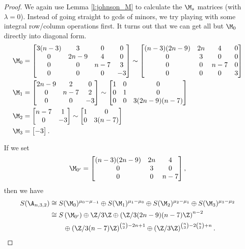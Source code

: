 \begin{proof} 
 We again use Lemma \ref{l:johnson_M} to calculate the $\M_s$ matrices (with $\lambda = 0$).  Instead of going straight to gcds of minors, we try playing with some integral row/column operations first.  It turns out that we can get all but $\M_{0}$ directly into diagonal form.
\begin{align*}
\M_0 &= \begin{bmatrix}
   3(n-3) & 3& 0& 0\\
    0& 2n-9& 4& 0\\
    0& 0& n-7& 3\\
    0& 0& 0& -3
\end{bmatrix} \sim \begin{bmatrix}
   (n-3)(2n-9) & 2n& 4& 0\\
    0& 3& 0& 0\\
    0& 0& n-7& 0\\
    0& 0& 0& 3
\end{bmatrix}\\
\M_1 &= \begin{bmatrix} 2n-9 & 2 & 0 \\ 0 & n-7 & 2 \\ 0 & 0 & -3 \end{bmatrix} \sim \begin{bmatrix} 1 & 0 & 0 \\ 0 & 1 & 0 \\ 0 & 0 & 3(2n-9)(n-7) \end{bmatrix}\\
 \M_2 &= \begin{bmatrix} n-7 & 1 \\ 0 & -3 \end{bmatrix} \sim \begin{bmatrix} 1 & 0 \\ 0 & 3(n-7) \end{bmatrix}\\
 \M_3 &= \begin{bmatrix} -3 \end{bmatrix}.
 \end{align*}

If we set
\[
\M_{0^{\prime}} = \begin{bmatrix}
   (n-3)(2n-9) & 2n& 4\\
    0& 3& 0\\
    0& 0& n-7
\end{bmatrix},
\] then we have
\begin{align*}
S(\A_{n,3,2}) &\cong S(\M_{0})^{\mu_{0}-\mu_{-1}} \oplus S(\M_{1})^{\mu_{1}-\mu_{0}} \oplus S(\M_{2})^{\mu_{2}-\mu_{1}} \oplus S(\M_{3})^{\mu_{3}-\mu_{2}}\\ 
&\cong S\left ( \M_{0^{\prime}} \right ) \oplus \Z/3\Z 
\oplus \left ( \Z/3(2n-9)(n-7)\Z \right )^{n-2} \\
&\qquad \oplus \left ( \Z/3(n-7)\Z \right )^{\binom{n}{2} - 2n + 1} \oplus \left ( \Z/3\Z \right )^{\binom{n}{3} - 2\binom{n}{2} + n}. 
\end{align*}


\end{proof}
